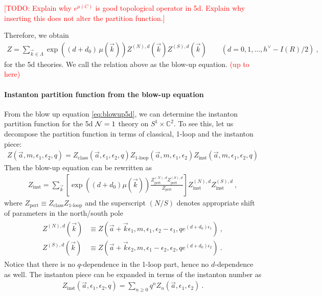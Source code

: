 \documentclass[letterpaper, 11pt]{article}
\def\IC{\mathbb{C}}
\def\CN{{\cal N}}
\def\e{\epsilon}
\begin{document}
\textcolor{red}{[TODO: Explain why $e^{\mu(C)}$ is good topological operator in 5d. Explain why inserting this does not alter the partition function.]}

Therefore, we obtain
\begin{align} \label{eq:blowup5d}
 Z = \sum_{\vec{k} \in \Lambda} \exp\left( (d+d_0)\, \mu(\vec{k}) \right) Z^{(N), d}(\vec{k})  Z^{(S), d}(\vec{k})  \qquad (d=0, 1, \ldots, h^\vee - I(R)/2 ) \ , 
\end{align} 
for the 5d theories. We call the relation above as the blow-up equation.  \textcolor{red}{(up to here)}

\paragraph{Instanton partition function from the blow-up equation}
From the blow up equation \eqref{eq:blowup5d}, we can determine the instanton partition function for the 5d $\CN=1$ theory on $S^1 \times \IC^2$. To see this, let us decompose the partition function in terms of classical, 1-loop and the instanton piece:
\begin{align}
 Z(\vec{a}, m, \e_1, \e_2, q) = Z_{\textrm{class}}(\vec{a}, \e_1, \e_2, q) Z_{\textrm{1-loop}} (\vec{a}, m, \e_1, \e_2) Z_{\textrm{inst}}(\vec{a}, m, \e_1, \e_2, q)
\end{align}
Then the blow-up equation can be rewritten as
\begin{align}
 Z_{\textrm{inst}} = \sum_{\vec{k}} \left[ \exp\left( (d+d_0) \mu(\vec{k}) \right)  \frac{Z^{(N), d}_{\textrm{pert}} Z^{(S), d}_{\textrm{pert}}}{Z_{\textrm{pert}}} \right] Z^{(N), d}_{\textrm{inst}} Z^{(S), d}_{\textrm{inst}}  \ , 
\end{align}
where $Z_{\textrm{pert}} \equiv Z_{\textrm{class}} Z_{\textrm{1-loop}}$ and the superscript $(N/S)$ denotes appropriate shift of parameters in the north/south pole 
\begin{align}
\begin{split}
 Z^{(N), d}(\vec{k}) &\equiv Z(\vec{a}+\vec{k} \e_1, m, \e_1, \e_2-\e_1, q e^{(d+d_0)\e_1}) \ , \\
 Z^{(S), d}(\vec{k}) &\equiv Z(\vec{a}+\vec{k} \e_2, m, \e_1 - \e_2, \e_2, q e^{(d+d_0)\e_2}) \ . 
\end{split}
\end{align}
 Notice that there is no $q$-dependence in the 1-loop part, hence no $d$-dependence as well. 
The instanton piece can be expanded in terms of the instanton number as
\begin{align}
 Z_{\textrm{inst}} (\vec{a}, \e_1, \e_2, q) = \sum_{n \ge 0} q^n Z_n (\vec{a}, \e_1, \e_2) \ . 
\end{align}
\end{document}
